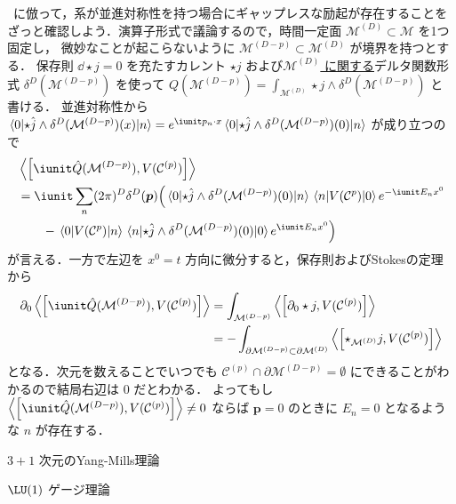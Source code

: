 \documentclass[TQFT_main]{subfiles}
\begin{document}
~\cite[p.5-6]{Lake2018SSB}に倣って，系が並進対称性を持つ場合にギャップレスな励起が存在することをざっと確認しよう．演算子形式で議論するので，時間一定面 $\mathcal{M}^{(D)} \subset \mathcal{M}$ を1つ固定し，
微妙なことが起こらないように $\mathcal{M}^{(D-p)} \subset \mathcal{M}^{(D)}$ が境界を持つとする．
保存則 $\dd \star j = 0$ を充たすカレント $\star j$ および\underline{$\mathcal{M}^{(D)}$ に関する}デルタ関数形式 $\delta^D(\mathcal{M}^{(D-p)})$ を使って $Q(\mathcal{M}^{(D-p)}) = \int_{\mathcal{M}^{(D)}} \star j \wedge \delta^D(\mathcal{M}^{(D-p)})$ と書ける．
並進対称性から $\mel{0}{\star \hat{j} \wedge \delta^D(\mathcal{M}^{(D-p)})(x)}{n} = e^{\iunit p_n \cdot x} \mel{0}{\star \hat{j} \wedge \delta^D(\mathcal{M}^{(D-p)})(0)}{n}$ が成り立つので
\begin{align}
    &\expval{\comm{\iunit \hat{Q}(\mathcal{M}^{(D-p)})}{V(\mathcal{C}^{(p)})}} \\
    &= \iunit \sum_n (2\pi)^{D} \delta^D(\bm{p}) \Bigl( \mel{0}{\star \hat{j} \wedge \delta^D(\mathcal{M}^{(D-p)}) (0)}{n} \mel{n}{V(\mathcal{C}^{p})}{0} e^{-\iunit E_n x^0} \\
    &\qquad -  \mel{0}{V(\mathcal{C}^{p})}{n} \mel{n}{\star \hat{j} \wedge \delta^D(\mathcal{M}^{(D-p)}) (0)}{0} e^{\iunit E_n x^0}\Bigr) 
\end{align}
が言える．一方で左辺を $x^0 = t$ 方向に微分すると，保存則およびStokesの定理から
\begin{align}
    \partial_0\expval{\comm{\iunit \hat{Q}(\mathcal{M}^{(D-p)})}{V(\mathcal{C}^{(p)})}}
    &= \int_{\mathcal{M}^{(D-p)}} \expval{\comm{\partial_0 \star j}{V(\mathcal{C}^{(p)})}} \\
    &= -\int_{\partial\mathcal{M}^{(D-p)} \subset \partial \mathcal{M}^{(D)}} \expval{\comm{\star_{\mathcal{M}^{(D)}} j}{V(\mathcal{C}^{(p)})}}
\end{align}
となる．次元を数えることでいつでも $\mathcal{C}^{(p)} \cap \partial\mathcal{M}^{(D-p)} = \emptyset$ にできることがわかるので結局右辺は $0$ だとわかる．
よってもし $\expval{\comm{\iunit \hat{Q}(\mathcal{M}^{(D-p)})}{V(\mathcal{C}^{(p)})}} \neq 0$ ならば $\bm{p} = 0$ のときに $E_n = 0$ となるような $n$ が存在する．

\begin{myexample}[label=ex:4dYM-1formSSB]{$3+1$ 次元のYang-Mills理論}
    
\end{myexample}

\begin{myexample}[label=ex:U1-1formSSB]{$\LU(1)$ ゲージ理論}
    
\end{myexample}
\end{document}

